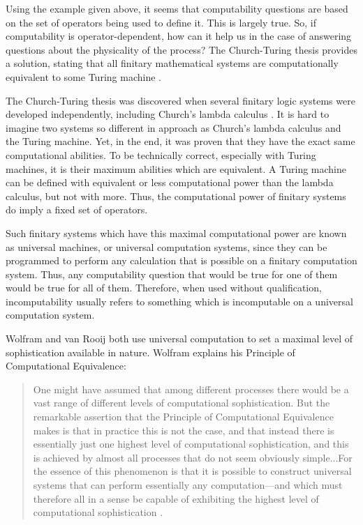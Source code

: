 Using the example given above, it seems that computability questions are based on the set of operators being used to define it.  This is largely true.  So, if computability is operator-dependent, how can it help us in the case of answering questions about the physicality of the process?  The Church-Turing thesis provides a solution, stating that all finitary mathematical systems are computationally equivalent to some Turing machine \citep{turing1937,turing1939}.    

The Church-Turing thesis was discovered when several finitary logic systems were developed independently, including Church's lambda calculus \citep{church1936,turing1937}.  It is hard to imagine two systems so different in approach as Church's lambda calculus and the Turing machine.  Yet, in the end, it was proven that they have the exact same computational abilities.  To be technically correct, especially with Turing machines, it is their maximum abilities which are equivalent.  A Turing machine can be defined with equivalent or less computational power than the lambda calculus, but not with more.  Thus, the computational power of finitary systems do imply a fixed set of operators.  

Such finitary systems which have this maximal computational power are known as universal machines, or universal computation systems, since they can be programmed to perform any calculation that is possible on a finitary computation system.  Thus, any computability question that would be true for one of them would be true for all of them.  Therefore, when used without qualification, incomputability usually refers to something which is incomputable on a universal computation system.

Wolfram and van Rooij both use universal computation to set a maximal level of sophistication available in nature.  Wolfram explains his Principle of Computational Equivalence:

\begin{quote}
One might have assumed that among different processes there would be a vast range of different levels of computational sophistication.  But the remarkable assertion that the Principle of Computational Equivalence makes is that in practice this is not the case, and that instead there is essentially just one highest level of computational sophistication, and this is achieved by almost all processes that do not seem obviously simple...For the essence of this phenomenon is that it is possible to construct universal systems that can perform essentially any computation---and which must therefore all in a sense be capable of exhibiting the highest level of computational sophistication \citep[][p.~717]{wolfram2002}.
\end{quote}

